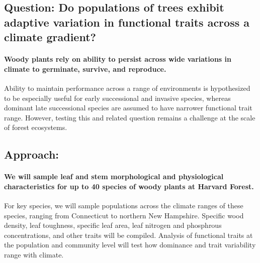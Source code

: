 \documentclass[11pt]{article}
\begin{document}
\subsection{Question: Do populations of trees exhibit adaptive variation in functional traits across a climate gradient?}

\paragraph{Woody plants rely on ability to persist across wide variations in climate to germinate, survive, and reproduce.} Ability to maintain performance across a range of environments is hypothesized to be especially useful for early successional and invasive species, whereas dominant late successional species are assumed to have narrower functional trait range. However, testing this and related question remains a challenge at the scale of forest ecosystems.

\subsection{Approach:}

\paragraph{We will sample leaf and stem morphological and physiological characteristics for up to 40 species of woody plants at Harvard Forest.} For key species, we will sample populations across the climate ranges of these species, ranging from Connecticut to northern New Hampshire. Specific wood density, leaf toughness, specific leaf area, leaf nitrogen and phosphrous concentrations, and other traits will be compiled. Analysis of functional traits at the population and community level will test how dominance and trait variability range with climate.


\end{document}
